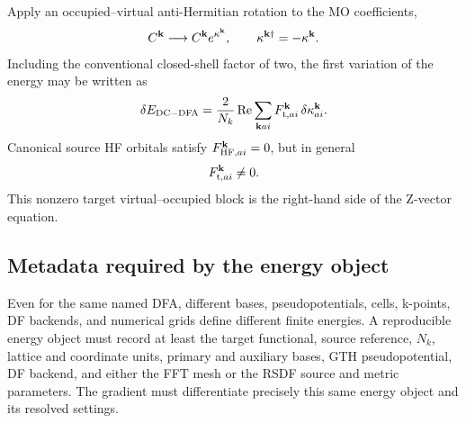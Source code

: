 Apply an occupied--virtual anti-Hermitian rotation to the MO coefficients,
\begin{equation}
  C^{\mathbf{k}}\longrightarrow C^{\mathbf{k}}e^{\kappa^{\mathbf{k}}},
  \qquad \kappa^{\mathbf{k}\dagger}=-\kappa^{\mathbf{k}}.
  \label{eq:orbital-rotation}
\end{equation}
Including the conventional closed-shell factor of two, the first variation of
the energy may be written as
\begin{equation}
  \delta E_{\mathrm{DC-DFA}}
  =\frac{2}{N_k}\operatorname{Re}
   \sum_{\mathbf{k} ai}F_{\mathrm t,ai}^{\mathbf{k}}\,
   \delta\kappa_{ai}^{\mathbf{k}}.
  \label{eq:target-orbital-gradient}
\end{equation}
Canonical source HF orbitals satisfy $F_{\mathrm{HF},ai}^{\mathbf{k}}=0$, but in
general
\begin{equation}
  F_{\mathrm t,ai}^{\mathbf{k}}\ne0.
  \label{eq:target-vo-nonzero}
\end{equation}
This nonzero target virtual--occupied block is the right-hand side of the
Z-vector equation.

\subsection{Metadata required by the energy object}

Even for the same named DFA, different bases, pseudopotentials, cells,
k-points, DF backends, and numerical grids define different finite energies.
A reproducible energy object must record at least the target functional, source
reference, $N_k$, lattice and coordinate units, primary and auxiliary bases,
GTH pseudopotential, DF backend, and either the FFT mesh or the RSDF source and
metric parameters.  The gradient must differentiate precisely this same
energy object and its resolved settings.

